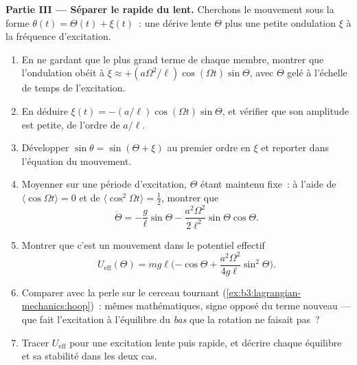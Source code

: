 \begin{problem}
\medskip\noindent\textbf{Partie III --- Séparer le rapide du lent.}
Cherchons le mouvement sous la forme $\theta(t) = \Theta(t) + \xi(t)$~:
une dérive lente $\Theta$ plus une petite ondulation $\xi$ à la fréquence d'excitation.
\begin{enumerate}[resume]
  \item En ne gardant que le plus grand terme de chaque membre, montrer
        que l'ondulation obéit à $\ddot\xi \approx +(a\Omega^2/\ell)\cos(\Omega t)
        \sin\Theta$, avec $\Theta$ gelé à l'échelle de temps de
        l'excitation.
  \item En déduire $\xi(t) = -(a/\ell)\cos(\Omega t)\sin\Theta$, et
        vérifier que son amplitude est petite, de l'ordre de $a/\ell$.
  \item Développer $\sin\theta = \sin(\Theta + \xi)$ au premier ordre en
        $\xi$ et reporter dans l'équation du mouvement.
  \item Moyenner sur une période d'excitation, $\Theta$ étant maintenu
        fixe~: à l'aide de $\langle\cos\Omega t\rangle = 0$ et de
        $\langle\cos^2\Omega t\rangle = \tfrac12$, montrer que
        \[
        \ddot\Theta = -\frac{g}{\ell}\sin\Theta
         - \frac{a^2\Omega^2}{2\ell^2}\sin\Theta\cos\Theta .
        \]
  \item Montrer que c'est un mouvement dans le potentiel effectif
        \[
        U_{\text{eff}}(\Theta) = mg\ell\Big({-\cos\Theta}
         + \frac{a^2\Omega^2}{4g\ell}\sin^2\Theta\Big) .
        \]
  \item Comparer avec la perle sur le cerceau tournant
        (\cref{ex:b3:lagrangian-mechanics:hoop})~: mêmes
        mathématiques, signe opposé du terme nouveau --- que fait
        l'excitation à l'équilibre du \emph{bas} que la rotation ne
        faisait pas~?
  \item Tracer $U_{\text{eff}}$ pour une excitation lente puis rapide,
        et décrire chaque équilibre et sa stabilité dans les deux cas.
\end{enumerate}


\end{problem}
